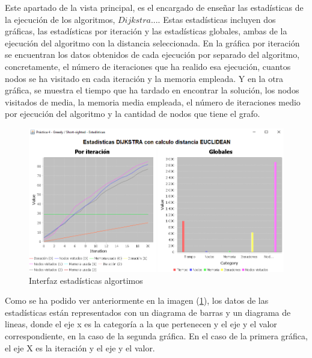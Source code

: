Este apartado de la vista principal, es el encargado de enseñar las estadísticas de la ejecución de los algoritmos, $Dijkstra$.... Estas estadísticas incluyen dos gráficas, las estadísticas por iteración y las estadísticas globales, ambas de la ejecución del algoritmo con la distancia seleccionada. En la gráfica por iteración se encuentran los datos obtenidos de cada ejecución por separado del algoritmo, concretamente, el número de iteraciones que ha realido esa ejecución, cuantos nodos se ha visitado en cada iteración y la memoria empleada. Y en la otra gráfica, se muestra el tiempo que ha tardado en encontrar la solución, los nodos visitados de media, la memoria media empleada, el número de iteraciones medio por ejecución del algoritmo y la cantidad de nodos que tiene el grafo. 

\begin{figure}[!h]
    \centering
    \includegraphics[width=\linewidth]{MVC/View/img/stats-algt.png}
    \caption{Interfaz estadísticas algortimos}
    \label{fig:Ejemplo stats Algt}
\end{figure}

Como se ha podido ver anteriormente en la imagen (\ref{fig:Ejemplo stats Algt}), los datos de las estadísticas están representados con un diagrama de barras y un diagrama de lineas, donde el eje x es la categoría a la que pertenecen y el eje y el valor correspondiente, en la caso de la segunda gráfica. En el caso de la primera gráfica, el eje X es la iteración y el eje y el valor.

